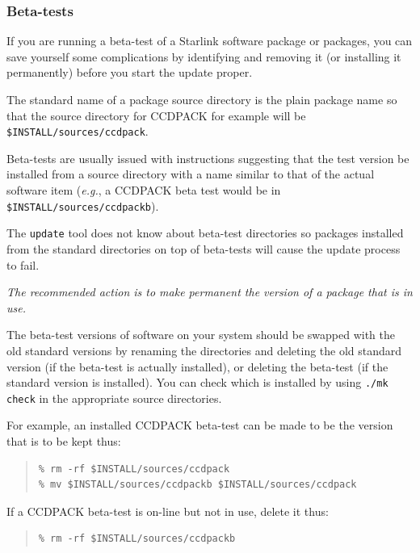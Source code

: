 \documentclass[twoside,11pt]{article}
\renewcommand{\_}{\texttt{\symbol{95}}}
\begin{document}
\subsubsection{Beta-tests}

If you are running a beta-test of a Starlink software package or packages,
you can save yourself some complications by identifying and removing it
(or installing it permanently) before you start the update proper.

The standard name of a package source directory is the plain package
name so that the source directory for CCDPACK for example will be
\texttt{\$INSTALL/sources/ccdpack}.

Beta-tests are usually issued with instructions suggesting that the test
version be installed from a source directory with a name similar to that
of the actual software item (\emph{e.g.}, a CCDPACK beta test would be
in \texttt{\$INSTALL/sources/ccdpackb}).

The \texttt{update} tool does not know about beta-test directories so
packages installed from the standard directories on top of beta-tests
will cause the update process to fail.

\emph{The recommended action is to make permanent the version of a package
that is in use.}

The beta-test versions of software on your system should be swapped with the
old standard versions by renaming the directories and deleting the old
standard version (if the beta-test is actually installed), or deleting the
beta-test (if the standard version is installed).  You can check which is
installed by using \texttt{./mk check} in the appropriate source
directories.

For example, an installed CCDPACK beta-test can be made to be the
version that is to be kept thus:

\begin{quote}
\begin{verbatim}
% rm -rf $INSTALL/sources/ccdpack
% mv $INSTALL/sources/ccdpackb $INSTALL/sources/ccdpack
\end{verbatim}
\end{quote}

If a CCDPACK beta-test is on-line but not in use, delete it thus:

\begin{quote}
\begin{verbatim}
% rm -rf $INSTALL/sources/ccdpackb
\end{verbatim}
\end{quote}
\end{document}

